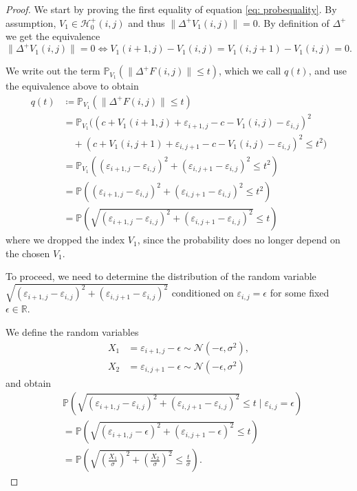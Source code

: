 \documentclass[a4paper,12pt]{article}
\newcommand{\norm}[1]{\lVert#1\rVert}
\theoremstyle{plain}
\theoremstyle{definition}
\begin{document}
\begin{proof}
	We start by proving the first equality of equation \eqref{eq: probequality}. By assumption, $V_1 \in \mathcal{H}_0^+(i, j)$ and thus $\norm{\Delta^+ V_1(i, j)} = 0$. By definition of $\Delta^+$ we get the equivalence
	\begin{equation*}
		\norm{\Delta^+ V_1(i, j)} = 0 \Leftrightarrow V_1(i + 1, j) - V_1(i, j) = V_1(i, j + 1) - V_1(i, j) = 0.
	\end{equation*}
	
	We write out the term $\mathbb{P}_{V_1}( \norm{\Delta^+ F(i, j)} \leq t )$, which we call $q(t)$, and use the equivalence above to obtain
	\begin{align*}
		q(t) &\coloneqq \mathbb{P}_{V_1}( \norm{\Delta^+ F(i, j)} \leq t ) \\
		&= \mathbb{P}_{V_1}\big( (c + V_1(i + 1, j) + \varepsilon_{i + 1, j} - c - V_1(i, j) - \varepsilon_{i, j})^2 \\
		&\quad + (c + V_1(i, j + 1) + \varepsilon_{i, j + 1} - c - V_1(i, j) - \varepsilon_{i, j})^2 \leq t^2 \big) \\
		&= \mathbb{P}_{V_1}\left( (\varepsilon_{i + 1, j} - \varepsilon_{i, j})^2 + (\varepsilon_{i, j + 1} - \varepsilon_{i, j})^2 \leq t^2 \right) \\
		&= \mathbb{P}\left( (\varepsilon_{i + 1, j} - \varepsilon_{i, j})^2 + (\varepsilon_{i, j + 1} - \varepsilon_{i, j})^2 \leq t^2 \right) \\
		&= \mathbb{P}\left( \sqrt{(\varepsilon_{i + 1, j} - \varepsilon_{i, j})^2 + (\varepsilon_{i, j + 1} - \varepsilon_{i, j})^2} \leq t \right)
	\end{align*}
	where we dropped the index $V_1$, since the probability does no longer depend on the chosen $V_1$.
	
	To proceed, we need to determine the distribution of the random variable $\sqrt{(\varepsilon_{i + 1, j} - \varepsilon_{i, j})^2 + (\varepsilon_{i, j + 1} - \varepsilon_{i, j})^2}$ conditioned on $\varepsilon_{i, j} = \epsilon$ for some fixed $\epsilon \in \mathbb{R}$.
	
	We define the random variables
	\begin{align*}
		X_1 &= \varepsilon_{i + 1, j} - \epsilon \sim \mathcal{N}(- \epsilon, \sigma^2), \\
		X_2 &= \varepsilon_{i, j + 1} - \epsilon \sim \mathcal{N}(- \epsilon, \sigma^2)
	\end{align*}
	and obtain
	\begin{align*}
		&\mathbb{P}\left( \sqrt{(\varepsilon_{i + 1, j} - \varepsilon_{i, j})^2 + (\varepsilon_{i, j + 1} - \varepsilon_{i, j})^2} \leq t \mid \varepsilon_{i, j} = \epsilon \right) \\
		&= \mathbb{P}\left( \sqrt{(\varepsilon_{i + 1, j} - \epsilon)^2 + (\varepsilon_{i, j + 1} - \epsilon)^2} \leq t \right) \\
		&= \mathbb{P}\left( \sqrt{\left( \frac{X_1}{\sigma} \right)^2 + \left( \frac{X_2}{\sigma} \right)^2} \leq \frac{t}{\sigma} \right).
	\end{align*}
	

\end{proof}
\end{document}
